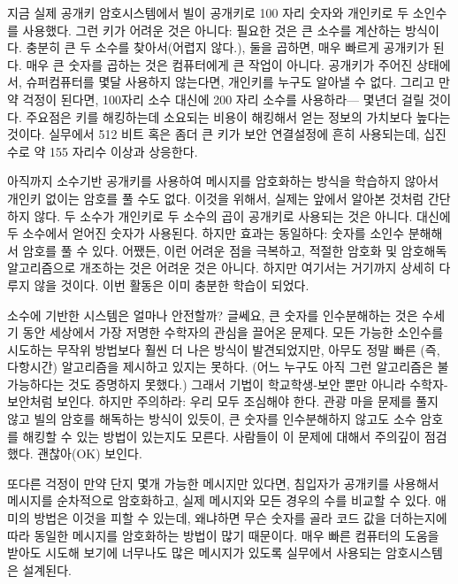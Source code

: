 \documentclass[]{article}
\begin{document}
지금 실제 공개키 암호시스템에서 빌이 공개키로 100 자리 숫자와 개인키로
두 소인수를 사용했다. 그런 키가 어려운 것은 아니다: 필요한 것은 큰
소수를 계산하는 방식이다. 충분히 큰 두 소수를 찾아서(어렵지 않다.), 둘을
곱하면, 매우 빠르게 공개키가 된다. 매우 큰 숫자를 곱하는 것은 컴퓨터에게
큰 작업이 아니다. 공개키가 주어진 상태에서, 슈퍼컴퓨터를 몇달 사용하지
않는다면, 개인키를 누구도 알아낼 수 없다. 그리고 만약 걱정이 된다면,
100자리 소수 대신에 200 자리 소수를 사용하라--- 몇년더 걸릴 것이다.
주요점은 키를 해킹하는데 소요되는 비용이 해킹해서 얻는 정보의 가치보다
높다는 것이다. 실무에서 512 비트 혹은 좀더 큰 키가 보안 연결설정에 흔히
사용되는데, 십진수로 약 155 자리수 이상과 상응한다.

아직까지 소수기반 공개키를 사용하여 메시지를 암호화하는 방식을 학습하지
않아서 개인키 없이는 암호를 풀 수도 없다. 이것을 위해서, 실제는 앞에서
알아본 것처럼 간단하지 않다. 두 소수가 개인키로 두 소수의 곱이 공개키로
사용되는 것은 아니다. 대신에 두 소수에서 얻어진 숫자가 사용된다. 하지만
효과는 동일하다: 숫자를 소인수 분해해서 암호를 풀 수 있다. 어쨌든, 이런
어려운 점을 극복하고, 적절한 암호화 및 암호해독 알고리즘으로 개조하는
것은 어려운 것은 아니다. 하지만 여기서는 거기까지 상세히 다루지 않을
것이다. 이번 활동은 이미 충분한 학습이 되었다.

소수에 기반한 시스템은 얼마나 안전할까? 글쎄요, 큰 숫자를 인수분해하는
것은 수세기 동안 세상에서 가장 저명한 수학자의 관심을 끌어온 문제다.
모든 가능한 소인수를 시도하는 무작위 방법보다 훨씬 더 나은 방식이
발견되었지만, 아무도 정말 빠른 (즉, 다항시간) 알고리즘을 제시하고 있지는
못하다. (어느 누구도 아직 그런 알고리즘은 불가능하다는 것도 증명하지
못했다.) 그래서 기법이 학교학생-보안 뿐만 아니라 수학자-보안처럼 보인다.
하지만 주의하라: 우리 모두 조심해야 한다. 관광 마을 문제를 풀지 않고
빌의 암호를 해독하는 방식이 있듯이, 큰 숫자를 인수분해하지 않고도 소수
암호를 해킹할 수 있는 방법이 있는지도 모른다. 사람들이 이 문제에 대해서
주의깊이 점검했다. 괜찮아(OK) 보인다.

또다른 걱정이 만약 단지 몇개 가능한 메시지만 있다면, 침입자가 공개키를
사용해서 메시지를 순차적으로 암호화하고, 실제 메시지와 모든 경우의 수를
비교할 수 있다. 애미의 방법은 이것을 피할 수 있는데, 왜냐하면 무슨
숫자를 골라 코드 값을 더하는지에 따라 동일한 메시지를 암호화하는 방법이
많기 때문이다. 매우 빠른 컴퓨터의 도움을 받아도 시도해 보기에 너무나도
많은 메시지가 있도록 실무에서 사용되는 암호시스템은 설계된다.
\end{document}

